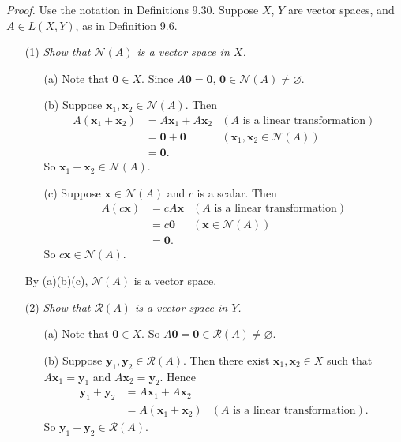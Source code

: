 \documentclass{article}
\begin{document}
\emph{Proof.}
Use the notation in Definitions 9.30.
Suppose $X$, $Y$ are vector spaces, and $A \in L(X,Y)$, as in Definition 9.6.
\begin{enumerate}
\item[(1)]
  \emph{Show that $\mathscr{N}(A)$ is a vector space in $X$.}
  \begin{enumerate}
  \item[(a)]
    Note that $\mathbf{0} \in X$.
    Since $A\mathbf{0} = \mathbf{0}$, $\mathbf{0} \in \mathscr{N}(A) \neq \varnothing$.

  \item[(b)]
    Suppose $\mathbf{x}_1, \mathbf{x}_2 \in \mathscr{N}(A)$.
    Then
    \begin{align*}
      A(\mathbf{x}_1+\mathbf{x}_2)
      &= A\mathbf{x}_1+A\mathbf{x}_2
        & (\text{$A$ is a linear transformation}) \\
      &= \mathbf{0}+\mathbf{0}
        & (\mathbf{x}_1, \mathbf{x}_2 \in \mathscr{N}(A)) \\
      &= \mathbf{0}.
    \end{align*}
    So $\mathbf{x}_1+\mathbf{x}_2 \in \mathscr{N}(A)$.

  \item[(c)]
    Suppose $\mathbf{x} \in \mathscr{N}(A)$ and $c$ is a scalar.
    Then
    \begin{align*}
      A(c\mathbf{x})
      &= cA\mathbf{x}
        & (\text{$A$ is a linear transformation}) \\
      &= c\mathbf{0}
        & (\mathbf{x} \in \mathscr{N}(A)) \\
      &= \mathbf{0}.
    \end{align*}
    So $c\mathbf{x} \in \mathscr{N}(A)$.
  \end{enumerate}
  By (a)(b)(c), $\mathscr{N}(A)$ is a vector space.

\item[(2)]
  \emph{Show that $\mathscr{R}(A)$ is a vector space in $Y$.}
  \begin{enumerate}
  \item[(a)]
    Note that $\mathbf{0} \in X$.
    So $A\mathbf{0} = \mathbf{0} \in \mathscr{R}(A) \neq \varnothing$.

  \item[(b)]
    Suppose $\mathbf{y}_1, \mathbf{y}_2 \in \mathscr{R}(A)$.
    Then there exist $\mathbf{x}_1, \mathbf{x}_2 \in X$
    such that $A\mathbf{x}_1 = \mathbf{y}_1$
    and $A\mathbf{x}_2 = \mathbf{y}_2$.
    Hence
    \begin{align*}
      \mathbf{y}_1+\mathbf{y}_2
      &= A\mathbf{x}_1+A\mathbf{x}_2 \\
      &= A(\mathbf{x}_1+\mathbf{x}_2)
        & (\text{$A$ is a linear transformation}).
    \end{align*}
    So $\mathbf{y}_1+\mathbf{y}_2 \in \mathscr{R}(A)$.


\end{enumerate}
\end{enumerate}
\end{document}
